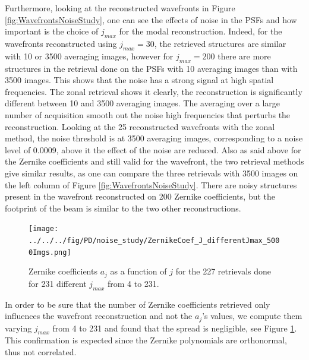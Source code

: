Furthermore, looking at the reconstructed wavefronts in Figure \ref{fig:WavefrontsNoiseStudy}, one can see the effects of noise in the PSFs and how important is the choice of $j_{max}$ for the modal reconstruction. Indeed, for the wavefronts reconstructed using $j_{max}=30$, the retrieved structures are similar with 10 or 3500 averaging images, however for $j_{max}=200$ there are more structures in the retrieval done on the PSFs with 10 averaging images than with 3500 images. This shows that the noise has a strong signal at high spatial frequencies. The zonal retrieval shows it clearly, the reconstruction is significantly different between 10 and 3500 averaging images. The averaging over a large number of acquisition smooth out the noise high frequencies that perturbs the reconstruction. Looking at the 25 reconstructed wavefronts with the zonal method, the noise threshold is at 3500 averaging images, corresponding to a noise level of 0.0009, above it the effect of the noise are reduced. Also as said above for the Zernike coefficients and still valid for the wavefront, the two retrieval methods give similar results, as one can compare the three retrievals with 3500 images on the left column of Figure \ref{fig:WavefrontsNoiseStudy}. There are noisy structures present in the wavefront reconstructed on 200 Zernike coefficients, but the footprint of the beam is similar to the two other reconstructions.


\begin{figure}
\begin{center}
\texttt{[image: ../../../fig/PD/noise\_study/ZernikeCoef\_J\_differentJmax\_5000Imgs.png]}
\decoRule
\caption{Zernike coefficients $a_j$ as a function of $j$ for the 227 retrievals done for 231 different $j_{max}$ from 4 to 231.}
\label{fig:ZernikeCoef_J_differentJmax_5000Imgs}
\end{center}
\end{figure}

In order to be sure that the number of Zernike coefficients retrieved only influences the wavefront reconstruction and not the $a_j$'s values, we compute them varying $j_{max}$ from 4 to 231 and found that the spread is negligible, see Figure \ref{fig:ZernikeCoef_J_differentJmax_5000Imgs}. This confirmation is expected since the Zernike polynomials are orthonormal, thus not correlated.

